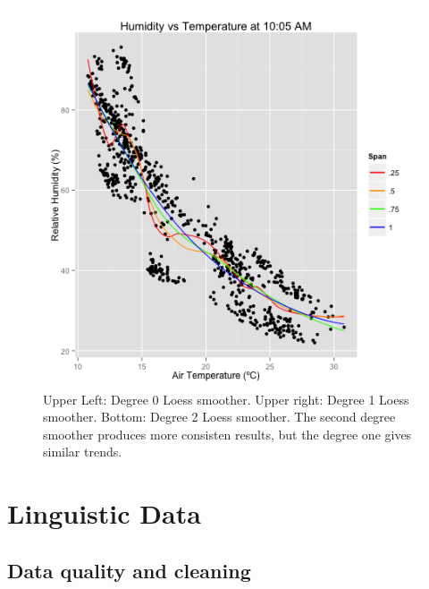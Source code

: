 \documentclass[english]{article}\usepackage{graphicx, color}
\numberwithin{equation}{section}
\numberwithin{figure}{section}
\begin{document}
\begin{figure}
\begin{center}
\includegraphics[scale = .4]{Humidity_Temperature_Loess_2.png}
\end{center}
\caption{Upper Left: Degree 0 Loess smoother. Upper right: Degree 1 Loess smoother. Bottom: Degree 2 Loess smoother. The second degree smoother produces more consisten results, but the degree one gives similar trends.}
\end{figure}



\section{Linguistic Data}


\subsection{Data quality and cleaning}
\end{document}
